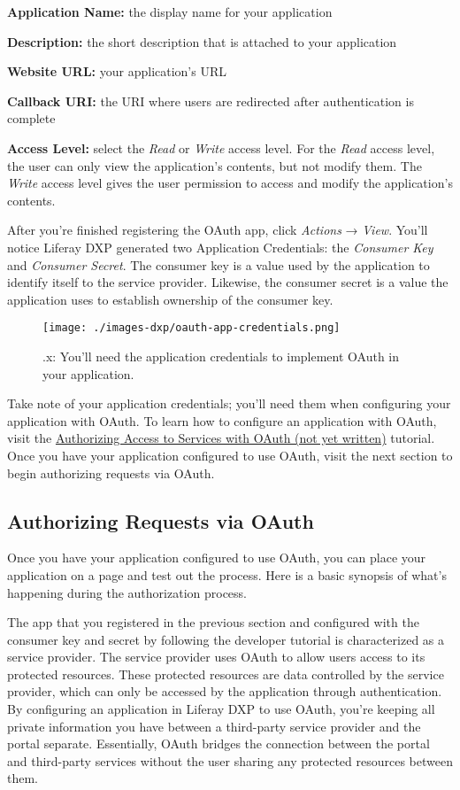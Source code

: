 \textbf{Application Name:} the display name for your application

\textbf{Description:} the short description that is attached to your
application

\textbf{Website URL:} your application's URL

\textbf{Callback URI:} the URI where users are redirected after
authentication is complete

\textbf{Access Level:} select the \emph{Read} or \emph{Write} access
level. For the \emph{Read} access level, the user can only view the
application's contents, but not modify them. The \emph{Write} access
level gives the user permission to access and modify the application's
contents.

After you're finished registering the OAuth app, click \emph{Actions} →
\emph{View}. You'll notice Liferay DXP generated two Application
Credentials: the \emph{Consumer Key} and \emph{Consumer Secret}. The
consumer key is a value used by the application to identify itself to
the service provider. Likewise, the consumer secret is a value the
application uses to establish ownership of the consumer key.

\begin{figure}
\centering
\texttt{[image: ./images-dxp/oauth-app-credentials.png]}
\caption{.x: You'll need the application credentials to implement OAuth
in your application.}
\end{figure}

Take note of your application credentials; you'll need them when
configuring your application with OAuth. To learn how to configure an
application with OAuth, visit the \href{}{Authorizing Access to Services
with OAuth (not yet written)} tutorial. Once you have your application
configured to use OAuth, visit the next section to begin authorizing
requests via OAuth.

\subsection{Authorizing Requests via
OAuth}\label{authorizing-requests-via-oauth}

Once you have your application configured to use OAuth, you can place
your application on a page and test out the process. Here is a basic
synopsis of what's happening during the authorization process.

The app that you registered in the previous section and configured with
the consumer key and secret by following the developer tutorial is
characterized as a service provider. The service provider uses OAuth to
allow users access to its protected resources. These protected resources
are data controlled by the service provider, which can only be accessed
by the application through authentication. By configuring an application
in Liferay DXP to use OAuth, you're keeping all private information you
have between a third-party service provider and the portal separate.
Essentially, OAuth bridges the connection between the portal and
third-party services without the user sharing any protected resources
between them.


